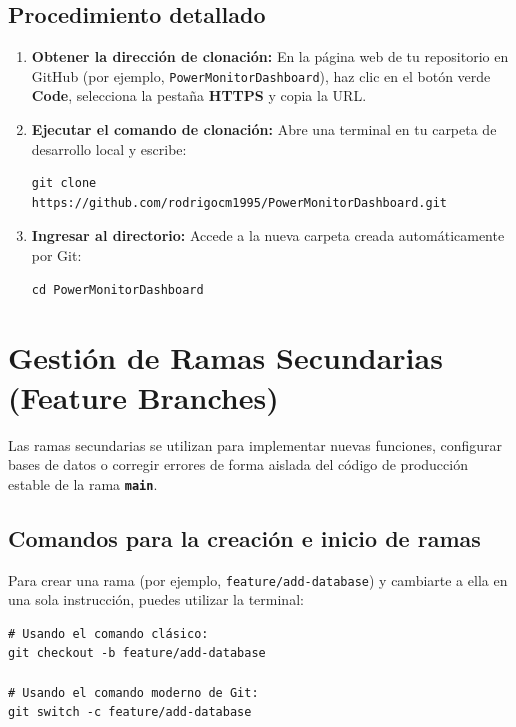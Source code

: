 \documentclass[
10pt, %
a4paper, %
oneside, %
headinclude,footinclude, %
BCOR5mm, %
]{scrartcl}
\begin{document}
\subsection{Procedimiento detallado}
\begin{enumerate}
	\item \textbf{Obtener la dirección de clonación:} En la página web de tu repositorio en GitHub (por ejemplo, \texttt{PowerMonitorDashboard}), haz clic en el botón verde \textbf{Code}, selecciona la pestaña \textbf{HTTPS} y copia la URL.
	\item \textbf{Ejecutar el comando de clonación:} Abre una terminal en tu carpeta de desarrollo local y escribe:
	\begin{lstlisting}[language=DOS]
	git clone https://github.com/rodrigocm1995/PowerMonitorDashboard.git
	\end{lstlisting}
	\item \textbf{Ingresar al directorio:} Accede a la nueva carpeta creada automáticamente por Git:
	\begin{lstlisting}[language=DOS]
	cd PowerMonitorDashboard
	\end{lstlisting}
\end{enumerate}

\newpage
\section{Gestión de Ramas Secundarias (Feature Branches)}

Las ramas secundarias se utilizan para implementar nuevas funciones, configurar bases de datos o corregir errores de forma aislada del código de producción estable de la rama \textbf{\texttt{main}}.

\subsection{Comandos para la creación e inicio de ramas}
Para crear una rama (por ejemplo, \texttt{feature/add-database}) y cambiarte a ella en una sola instrucción, puedes utilizar la terminal:

\begin{lstlisting}[language=DOS]
# Usando el comando clásico:
git checkout -b feature/add-database

# Usando el comando moderno de Git:
git switch -c feature/add-database
\end{lstlisting}
\end{document}
